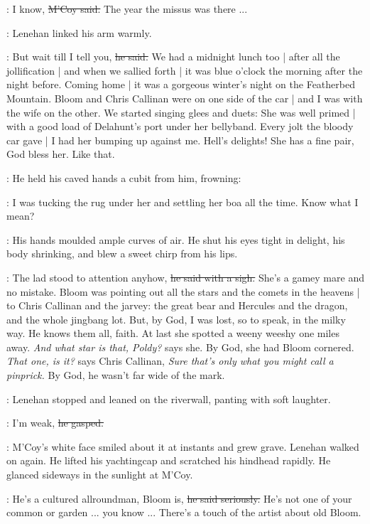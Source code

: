 \mcoy:
I know,
\sout{M'Coy said.}
The year the missus was there ...

:
Lenehan linked his arm warmly.

\lenehan:
But wait till I tell you,
\sout{he said.}
We had a midnight lunch too |
after all the jollification |
and when we sallied forth |
it was blue o'clock the morning after the night before.
Coming home |
it was a gorgeous winter's night on the Featherbed Mountain.
Bloom and Chris Callinan were on one side of the car |
and I was with the wife on the other.
We started singing glees and duets:
She was well primed |
with a good load of Delahunt's port under her bellyband.
Every jolt the bloody car gave |
I had her bumping up against me.
Hell's delights!
She has a fine pair, God bless her.
Like that.

:
He held his caved hands a cubit from him,
frowning:

\lenehan:
I was tucking the rug under her
and settling her boa all the time.
Know what I mean?

:
His hands moulded ample curves of air.
He shut his eyes tight in delight,
his body shrinking,
and blew a sweet chirp from his lips.

\lenehan:
The lad stood to attention anyhow,
\sout{he said with a sigh.}
She's a gamey mare and no mistake.
Bloom was pointing out all the stars and the comets in the heavens |
to Chris Callinan and the jarvey:
the great bear and Hercules and the dragon,
and the whole jingbang lot.
But, by God, I was lost,
so to speak,
in the milky way.
He knows them all, faith.
At last she spotted a weeny weeshy one miles away.
\emph{And what star is that, Poldy?}
says she.
By God, she had Bloom cornered.
\emph{That one, is it?}
says Chris Callinan,
\emph{Sure that's only what you might call a pinprick.}
By God, he wasn't far wide of the mark.

:
Lenehan stopped and leaned on the riverwall,
panting with soft laughter.

\lenehan:
I'm weak,
\sout{he gasped.}

:
M'Coy's white face smiled about it at instants and grew grave.
Lenehan walked on again.
He lifted his yachtingcap and scratched his hindhead rapidly.
He glanced sideways in the sunlight at M'Coy.

\lenehan:
He's a cultured allroundman,
Bloom is,
\sout{he said seriously.}
He's not one of your common or garden ...
you know ...
There's a touch of the artist about old Bloom.


